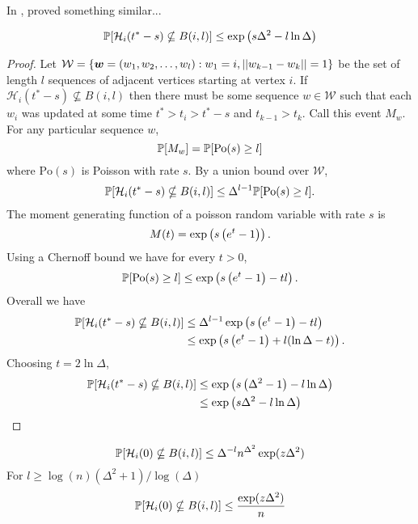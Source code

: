 In \cite{Lubetzky2016-wd}, \citeauthor{Lubetzky2016-wd} proved something similar...
\begin{lemma}
	\begin{equation}
		\mathbb{P}[\mathcal{H}_i(t^* - s) \nsubseteq B(i, l)] \leq \exp\left(s \Delta^2 - l \ln \Delta \right)
	\end{equation}
\end{lemma}
\begin{proof}
	Let $\mathcal{W} = \{{\bm{{w}}} = (w_1, w_2, \dots, w_l) : w_1 = i, ||w_{k-1} - w_k|| = 1\}$ be the set of length $l$ sequences of adjacent vertices starting at vertex $i$. If $\mathcal{H}_i(t^* - s) \nsubseteq B(i, l)$ then there must be some sequence $w \in \mathcal{W}$ such that each $w_i$ was updated at some time $t^* > t_i > t^* - s$ and $t_{k-1} > t_k$. Call this event $M_w$. For any particular sequence $w$,
	\begin{equation}
		\mathbb{P}[M_w] = \mathbb{P}[\mathrm{Po}(s) \geq l]
	\end{equation}
	where $\mathrm{Po}(s)$ is Poisson with rate $s$. By a union bound over $\mathcal{W}$,
	\begin{equation}
		\mathbb{P}[\mathcal{H}_i(t^* - s) \nsubseteq B(i, l)] \leq \Delta^{l-1} \mathbb{P}[\mathrm{Po}(s) \geq l].
	\end{equation}
	The moment generating function of a poisson random variable with rate $s$ is
	\begin{equation}
		M(t) = \exp\left(s\left(e^t - 1\right)\right).
	\end{equation}
	Using a Chernoff bound we have for every $t > 0$,
	\begin{equation}
		\mathbb{P}[\mathrm{Po}(s) \geq l] \leq \exp\left(s\left(e^t - 1\right) - t l\right).
	\end{equation}
	Overall we have
	\begin{align}
		\mathbb{P}[\mathcal{H}_i(t^* - s) \nsubseteq B(i, l)] &\leq \Delta^{l-1} \exp\left(s\left(e^t - 1\right) - t l\right)\\
		&\leq \exp\left(s\left(e^t - 1\right) + l (\ln \Delta - t) \right).
	\end{align}
	Choosing $t = 2 \ln \Delta$,
	\begin{align}
		\mathbb{P}[\mathcal{H}_i(t^* - s) \nsubseteq B(i, l)] &\leq \exp\left(s\left(\Delta^2 - 1\right) - l \ln \Delta \right)\\
		&\leq \exp\left(s \Delta^2 - l \ln \Delta \right)\\
	\end{align}
\end{proof}

\begin{corollary}
	\begin{equation}
		\mathbb{P}[\mathcal{H}_i(0) \nsubseteq B(i,l)] \leq \Delta^{-l} n^{\Delta^2} \exp(z \Delta^2)
	\end{equation}
	For $l \geq \log(n)(\Delta^2 + 1)/\log(\Delta)$
	\begin{equation}
			\mathbb{P}[\mathcal{H}_i(0) \nsubseteq B(i,l)] \leq \frac{\exp(z \Delta^2)}{n}
	\end{equation}
\end{corollary}